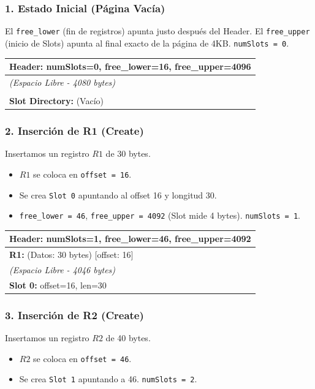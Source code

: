 \documentclass[12pt,a4paper]{article}
\begin{document}
\subsubsection*{1. Estado Inicial (Página Vacía)}
El \texttt{free\_lower} (fin de registros) apunta justo después del Header. El \texttt{free\_upper} (inicio de Slots) apunta al final exacto de la página de 4KB. \texttt{numSlots = 0}.

\begin{center}
\begin{tabular}{|p{10cm}|}
\hline
\textbf{Header:} numSlots=0, free\_lower=16, free\_upper=4096 \\ \hline
\textit{(Espacio Libre - 4080 bytes)} \\
\vspace{1cm} \\ \hline
\textbf{Slot Directory:} (Vacío) \\ \hline
\end{tabular}
\end{center}

\subsubsection*{2. Inserción de R1 (Create)}
Insertamos un registro $R1$ de 30 bytes.
\begin{itemize}
    \item $R1$ se coloca en \texttt{offset = 16}.
    \item Se crea \texttt{Slot 0} apuntando al offset 16 y longitud 30.
    \item \texttt{free\_lower = 46}, \texttt{free\_upper = 4092} (Slot mide 4 bytes). \texttt{numSlots = 1}.
\end{itemize}

\begin{center}
\begin{tabular}{|p{10cm}|}
\hline
\textbf{Header:} numSlots=1, free\_lower=46, free\_upper=4092 \\ \hline
\textbf{R1:} (Datos: 30 bytes) [offset: 16] \\ \hline
\textit{(Espacio Libre - 4046 bytes)} \\ \hline
\textbf{Slot 0:} offset=16, len=30 \\ \hline
\end{tabular}
\end{center}

\subsubsection*{3. Inserción de R2 (Create)}
Insertamos un registro $R2$ de 40 bytes.
\begin{itemize}
    \item $R2$ se coloca en \texttt{offset = 46}.
    \item Se crea \texttt{Slot 1} apuntando a 46. \texttt{numSlots = 2}.
\end{itemize}
\end{document}
